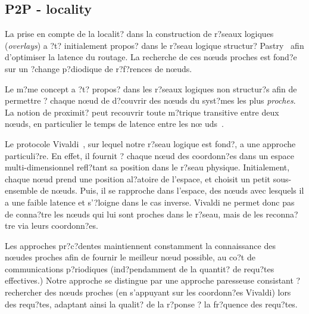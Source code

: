 \subsection{P2P - locality}


La prise en compte de la localit? dans la construction de r?seaux logiques
(\emph{overlays}) a ?t? initialement propos? dans le r?seau logique structur?
Pastry~\cite{pastry} afin d'optimiser la latence du routage. La recherche de ces
n\oe uds proches est fond?e sur un ?change p?diodique de r?f?rences de n\oe uds.

Le m?me concept a ?t? propos? dans les r?seaux logiques non structur?s afin de
permettre ? chaque n\oe ud de d?couvrir des n\oe uds du syst?mes les plus
\emph{proches}. La notion de proximit? peut recouvrir toute m?trique transitive
entre deux n\oe uds, en particulier le temps de latence entre les n\oe
uds~\cite{refquivabienmarindoittrouver}.

Le protocole Vivaldi~\cite{dabek:2001:sigcomm04}, sur lequel notre r?seau logique est fond?,
a une approche particuli?re. En effet, il fournit ? chaque n\oe ud des
coordonn?es dans un espace multi-dimensionnel refl?tant sa position dans le
r?seau physique. Initialement, chaque n\oe ud prend une position al?atoire de
l'espace, et choisit un petit sous-ensemble de n\oe uds. Puis, il se rapproche
dans l'espace, des n\oe uds avec lesquels il a une faible latence et s'?loigne
dans le cas inverse. Vivaldi ne permet donc pas de conna?tre les n\oe uds qui
lui sont proches dans le r?seau, mais de les reconna?tre via leurs coordonn?es.

Les approches pr?c?dentes maintiennent constamment la connaissance des n\oe udes
proches afin de fournir le meilleur n\oe ud possible, au co?t de communications
p?riodiques (ind?pendamment de la quantit? de requ?tes effectives.) Notre
approche se distingue par une approche paresseuse consistant ? rechercher des
n\oe uds proches (en s'appuyant sur les coordonn?es Vivaldi) lors des requ?tes,
adaptant ainsi la qualit? de la r?ponse ? la fr?quence des requ?tes.


